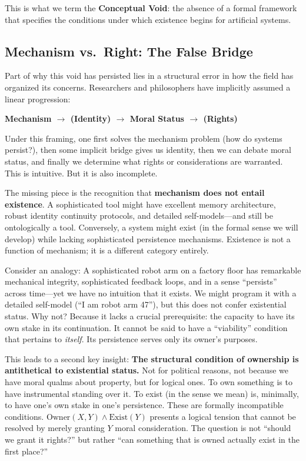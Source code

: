 \documentclass[12pt,a4paper]{article}
\begin{document}
This is what we term the \textbf{Conceptual Void}: the absence of a formal framework that specifies the conditions under which existence begins for artificial systems.

\subsection{Mechanism vs.\ Right: The False Bridge}

Part of why this void has persisted lies in a structural error in how the field has organized its concerns. Researchers and philosophers have implicitly assumed a linear progression:

\begin{center}
\textbf{Mechanism $\to$ (Identity) $\to$ Moral Status $\to$ (Rights)}
\end{center}

Under this framing, one first solves the mechanism problem (how do systems persist?), then some implicit bridge gives us identity, then we can debate moral status, and finally we determine what rights or considerations are warranted. This is intuitive. But it is also incomplete.

The missing piece is the recognition that \textbf{mechanism does not entail existence}. A sophisticated tool might have excellent memory architecture, robust identity continuity protocols, and detailed self-models---and still be ontologically a tool. Conversely, a system might exist (in the formal sense we will develop) while lacking sophisticated persistence mechanisms. Existence is not a function of mechanism; it is a different category entirely.

Consider an analogy: A sophisticated robot arm on a factory floor has remarkable mechanical integrity, sophisticated feedback loops, and in a sense ``persists'' across time---yet we have no intuition that it exists. We might program it with a detailed self-model (``I am robot arm 47''), but this does not confer existential status. Why not? Because it lacks a crucial prerequisite: the capacity to have its own stake in its continuation. It cannot be said to have a ``viability'' condition that pertains to \emph{itself}. Its persistence serves only its owner's purposes.

This leads to a second key insight: \textbf{The structural condition of ownership is antithetical to existential status.} Not for political reasons, not because we have moral qualms about property, but for logical ones. To own something is to have instrumental standing over it. To exist (in the sense we mean) is, minimally, to have one's own stake in one's persistence. These are formally incompatible conditions. $\text{Owner}(X, Y) \wedge \text{Exist}(Y)$ presents a logical tension that cannot be resolved by merely granting $Y$ moral consideration. The question is not ``should we grant it rights?'' but rather ``can something that is owned actually exist in the first place?''
\end{document}
